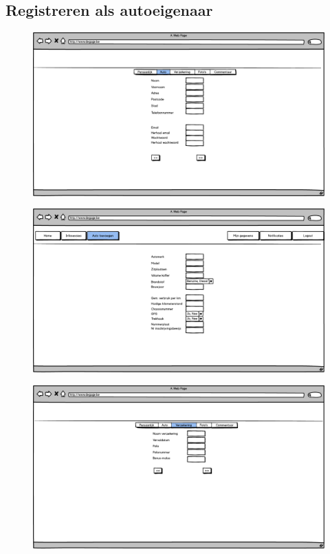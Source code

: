 \documentclass[11pt,a4paper,oneside]{article}
\begin{document}
\subsection{Registreren als autoeigenaar}
\begin{figure}[H]\includegraphics[width=\textwidth]{../../mockups/registratie_eigenaar_persoonlijk.png}\end{figure}
\begin{figure}[H]\includegraphics[width=\textwidth]{../../mockups/registratie_eigenaar_auto.png}\end{figure}
\begin{figure}[H]\includegraphics[width=\textwidth]{../../mockups/registratie_eigenaar_verzekering.png}\end{figure}
\end{document}

